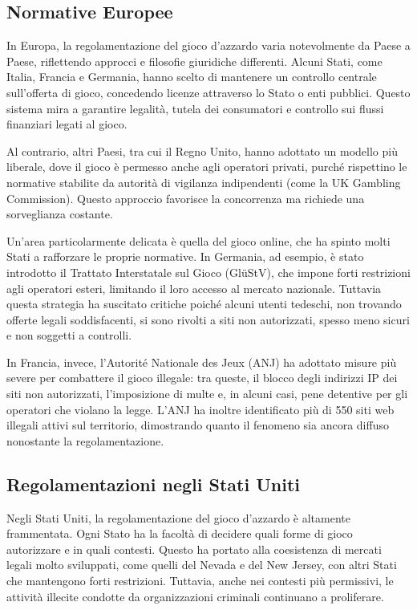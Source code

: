 \documentclass[a4paper,12pt]{article}
\begin{document}
\subsection{Normative Europee}

In Europa, la regolamentazione del gioco d’azzardo varia notevolmente da Paese a Paese, riflettendo approcci e filosofie giuridiche differenti. Alcuni Stati, come Italia, Francia e Germania, hanno scelto di mantenere un controllo centrale sull’offerta di gioco, concedendo licenze attraverso lo Stato o enti pubblici. Questo sistema mira a garantire legalità, tutela dei consumatori e controllo sui flussi finanziari legati al gioco.

Al contrario, altri Paesi, tra cui il Regno Unito, hanno adottato un modello più liberale, dove il gioco è permesso anche agli operatori privati, purché rispettino le normative stabilite da autorità di vigilanza indipendenti (come la UK Gambling Commission). Questo approccio favorisce la concorrenza ma richiede una sorveglianza costante.

Un’area particolarmente delicata è quella del gioco online, che ha spinto molti Stati a rafforzare le proprie normative. In Germania, ad esempio, è stato introdotto il Trattato Interstatale sul Gioco (GlüStV), che impone forti restrizioni agli operatori esteri, limitando il loro accesso al mercato nazionale. Tuttavia questa strategia ha suscitato critiche poiché alcuni utenti tedeschi, non trovando offerte legali soddisfacenti, si sono rivolti a siti non autorizzati, spesso meno sicuri e non soggetti a controlli.

In Francia, invece, l’Autorité Nationale des Jeux (ANJ) ha adottato misure più severe per combattere il gioco illegale: tra queste, il blocco degli indirizzi IP dei siti non autorizzati, l’imposizione di multe e, in alcuni casi, pene detentive per gli operatori che violano la legge. L’ANJ ha inoltre identificato più di 550 siti web illegali attivi sul territorio, dimostrando quanto il fenomeno sia ancora diffuso nonostante la regolamentazione.

\subsection{Regolamentazioni negli Stati Uniti}

Negli Stati Uniti, la regolamentazione del gioco d’azzardo è altamente frammentata. Ogni Stato ha la facoltà di decidere quali forme di gioco autorizzare e in quali contesti. Questo ha portato alla coesistenza di mercati legali molto sviluppati, come quelli del Nevada e del New Jersey, con altri Stati che mantengono forti restrizioni. Tuttavia, anche nei contesti più permissivi, le attività illecite condotte da organizzazioni criminali continuano a proliferare.
\cite{banks2018taxonomy}
\end{document}
